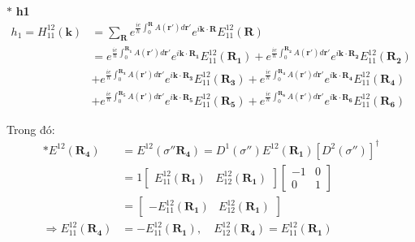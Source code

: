 \documentclass{article}
\begin{document}
\noindent $\ast$ \textbf{h1}
\begin{align*}
    h_1 = H_{11}^{12}(\textbf{k}) & = \sum_{\textbf{R}} e^{\frac{ie}{\hbar}\int_{0}^{\mathbf{R}}A(\mathbf{r'})d\mathbf{r'}}e^{i\mathbf{k\cdot R}} E_{11}^{12}(\mathbf{R})                                                                                                               \\
                                  & = e^{\frac{ie}{\hbar}\int_{0}^{\mathbf{R_1}}A(\mathbf{r'})d\mathbf{r'}}e^{i\mathbf{k\cdot R_1}} E_{11}^{12}(\mathbf{R_1}) + e^{\frac{ie}{\hbar}\int_{0}^{\mathbf{R_2}}A(\mathbf{r'})d\mathbf{r'}}e^{i\mathbf{k\cdot R_2}} E_{11}^{12}(\mathbf{R_2}) \\
                                  & + e^{\frac{ie}{\hbar}\int_{0}^{\mathbf{R_3}}A(\mathbf{r'})d\mathbf{r'}}e^{i\mathbf{k\cdot R_3}} E_{11}^{12}(\mathbf{R_3}) + e^{\frac{ie}{\hbar}\int_{0}^{\mathbf{R_4}}A(\mathbf{r'})d\mathbf{r'}}e^{i\mathbf{k\cdot R_4}} E_{11}^{12}(\mathbf{R_4}) \\
                                  & + e^{\frac{ie}{\hbar}\int_{0}^{\mathbf{R_5}}A(\mathbf{r'})d\mathbf{r'}}e^{i\mathbf{k\cdot R_5}} E_{11}^{12}(\mathbf{R_5}) + e^{\frac{ie}{\hbar}\int_{0}^{\mathbf{R_6}}A(\mathbf{r'})d\mathbf{r'}}e^{i\mathbf{k\cdot R_6}} E_{11}^{12}(\mathbf{R_6})
\end{align*}

Trong đó:
\begin{align*}
    \ast E^{12}(\mathbf{R_4})             & = E^{12}(\sigma''\mathbf{R_4}) = D^1(\sigma'') E^{12}(\mathbf{R_1}) \left[D^2(\sigma'')\right]^\dagger \\
                                          & = 1
    \begin{bmatrix}
        E_{11}^{12}(\mathbf{R_1}) & E_{12}^{12}(\mathbf{R_1})
    \end{bmatrix}
    \begin{bmatrix}
        -1 & 0 \\
        0  & 1
    \end{bmatrix}                                                                                                                                 \\
                                          & =
    \begin{bmatrix}
        - E_{11}^{12}(\mathbf{R_1}) & E_{12}^{12}(\mathbf{R_1})
    \end{bmatrix}                                                                                        \\
    \Rightarrow E_{11}^{12}(\mathbf{R_4}) & = - E_{11}^{12}(\mathbf{R_1}) , \quad E_{12}^{12}(\mathbf{R_4}) = E_{11}^{12}(\mathbf{R_1})
\end{align*}
\end{document}
